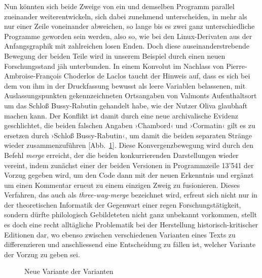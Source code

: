 \documentclass[a4paper,11pt]{article}
\newcommand{\inanf}[1]{›#1‹}
\newcommand{\anzeige}{\textbf{\color{hokkaido}\huge{\raisebox{-0.18ex}{$\bullet$}}\color{black}}}
\begin{document}
Nun könnten sich beide Zweige von ein und demselben Programm parallel zueinander weiterentwickeln, sich dabei zunehmend unterscheiden, in mehr als nur einer Zeile voneinander abweichen, so lange bis es zwei ganz unterschiedliche Programme geworden sein werden, also so, wie bei den Linux-Derivaten aus der Anfangsgraphik mit zahlreichen losen Enden. Doch diese auseinanderstrebende Bewegung der beiden Teile wird in unserem Beispiel durch einen neuen Forschungsstand jäh unterbunden. In einem Konvolut im Nachlass von Pierre-Ambroise-François Choderlos de Laclos taucht der Hinweis auf, dass es sich bei dem von ihm in der Druckfassung bewusst als leere Variablen belassenen, mit Auslassungspunkten gekennzeichneten Ortsangaben von Valmonts Aufenthaltsort um das Schloß Bussy-Rabutin gehandelt habe, wie der Nutzer {\color{olive}Oliva} glaubhaft machen kann. Der Konflikt ist damit durch eine neue archivalische Evidenz geschlichtet, die beiden falschen Angaben \inanf{Chambord} und \inanf{Cormatin} gilt es zu ersetzen durch \inanf{Schloß Bussy-Rabutin}, um damit die beiden separaten Stränge wieder zusammenzuführen [Abb.~\ref{abb:merge}\anzeige]. Diese Konvergenzbewegung wird durch den Befehl \emph{merge} erreicht, der die beiden konkurrierenden Darstellungen wieder vereint, indem zunächst einer der beiden Versionen in Programmzeile 13'541 der Vorzug gegeben wird, um den Code dann mit der neuen Erkenntnis und ergänzt um einen Kommentar erneut zu einem einzigen Zweig zu fusionieren. Dieses Verfahren, das auch als \emph{three-way-merge} bezeichnet wird, erfreut sich nicht nur in der theoretischen Informatik der Gegenwart einer regen Forschungstätigkeit, sondern dürfte philologisch Gebildeteten nicht ganz unbekannt vorkommen, stellt es doch eine recht alltägliche Problematik bei der Herstellung historisch-kritischer Editionen dar, wo ebenso zwischen verschiedenen Varianten eines Texts zu differenzieren und anschliessend eine Entscheidung zu fällen ist, welcher Variante der Vorzug zu geben sei.


\begin{figure}[hpt]
\begin{center}




\end{center}
\caption{Neue Variante der Varianten}\label{abb:merge}
\end{figure}
\end{document}
